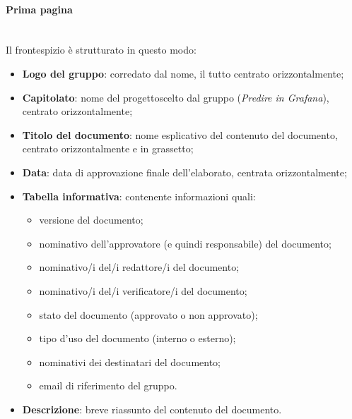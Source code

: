 	        \paragraph*{Prima pagina}\mbox{}\\ [1mm]
	            Il frontespizio è strutturato in questo modo:
	            \begin{itemize}
	                \item \textbf{Logo del gruppo}: corredato dal nome, il tutto centrato orizzontalmente;
	                \item \textbf{Capitolato}\glo: nome del progetto\glosp scelto dal gruppo (\textit{Predire in Grafana}), centrato orizzontalmente;
	                \item \textbf{Titolo del documento}: nome esplicativo del contenuto del documento, centrato orizzontalmente e in grassetto;
	                \item \textbf{Data}: data di approvazione finale dell'elaborato, centrata orizzontalmente;
	                \item \textbf{Tabella informativa}: contenente informazioni quali:
	                \begin{itemize}
	                    \item versione del documento;
	                    \item nominativo dell'approvatore (e quindi responsabile) del documento;
	                    \item nominativo/i del/i redattore/i del documento;
	                    \item nominativo/i del/i verificatore/i del documento;
	                    \item stato del documento (approvato o non approvato);
	                    \item tipo d'uso del documento (interno o esterno);
	                    \item nominativi dei destinatari del documento;
	                    \item email di riferimento del gruppo.
	                \end{itemize} 
	                \item \textbf{Descrizione}: breve riassunto del contenuto del documento.
	            \end{itemize}
